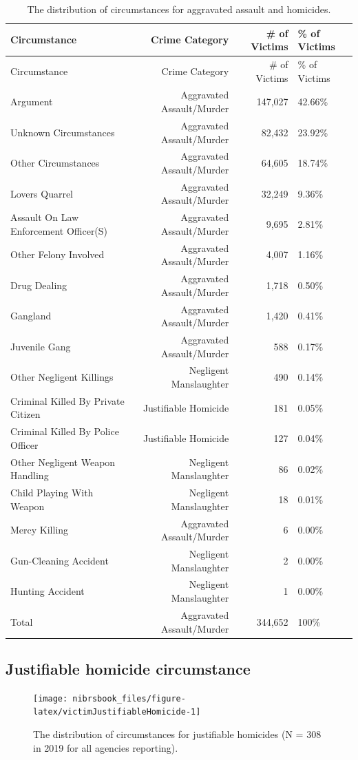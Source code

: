 \documentclass[
  12pt,
  openany]{book}
\begin{document}
\begin{longtable}[]{@{}lrrl@{}}
\caption{\label{tab:victimAggAssault}The distribution of circumstances for aggravated assault and homicides.}\tabularnewline
\toprule
Circumstance & Crime Category & \# of Victims & \% of Victims\tabularnewline
\midrule
\endfirsthead
\toprule
Circumstance & Crime Category & \# of Victims & \% of Victims\tabularnewline
\midrule
\endhead
Argument & Aggravated Assault/Murder & 147,027 & 42.66\%\tabularnewline
Unknown Circumstances & Aggravated Assault/Murder & 82,432 & 23.92\%\tabularnewline
Other Circumstances & Aggravated Assault/Murder & 64,605 & 18.74\%\tabularnewline
Lovers Quarrel & Aggravated Assault/Murder & 32,249 & 9.36\%\tabularnewline
Assault On Law Enforcement Officer(S) & Aggravated Assault/Murder & 9,695 & 2.81\%\tabularnewline
Other Felony Involved & Aggravated Assault/Murder & 4,007 & 1.16\%\tabularnewline
Drug Dealing & Aggravated Assault/Murder & 1,718 & 0.50\%\tabularnewline
Gangland & Aggravated Assault/Murder & 1,420 & 0.41\%\tabularnewline
Juvenile Gang & Aggravated Assault/Murder & 588 & 0.17\%\tabularnewline
Other Negligent Killings & Negligent Manslaughter & 490 & 0.14\%\tabularnewline
Criminal Killed By Private Citizen & Justifiable Homicide & 181 & 0.05\%\tabularnewline
Criminal Killed By Police Officer & Justifiable Homicide & 127 & 0.04\%\tabularnewline
Other Negligent Weapon Handling & Negligent Manslaughter & 86 & 0.02\%\tabularnewline
Child Playing With Weapon & Negligent Manslaughter & 18 & 0.01\%\tabularnewline
Mercy Killing & Aggravated Assault/Murder & 6 & 0.00\%\tabularnewline
Gun-Cleaning Accident & Negligent Manslaughter & 2 & 0.00\%\tabularnewline
Hunting Accident & Negligent Manslaughter & 1 & 0.00\%\tabularnewline
Total & Aggravated Assault/Murder & 344,652 & 100\%\tabularnewline
\bottomrule
\end{longtable}

\hypertarget{justifiable-homicide-circumstance}{%
\subsection{Justifiable homicide circumstance}\label{justifiable-homicide-circumstance}}

\begin{figure}

{\centering \texttt{[image: nibrsbook\_files/figure-latex/victimJustifiableHomicide-1]} 

}

\caption{The distribution of circumstances for justifiable homicides (N = 308 in 2019 for all agencies reporting).}\label{fig:victimJustifiableHomicide}
\end{figure}
\end{document}
